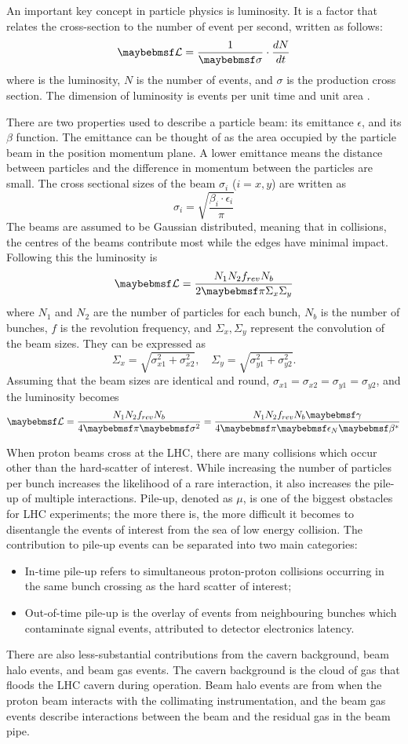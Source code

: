 An important key concept in particle physics is luminosity. It is a factor that relates the cross-section to the number of event per second, written as follows:
$$\luminosity=\dfrac{1}{\sigma}\cdot\dfrac{dN}{dt}$$
where \luminosity is the luminosity, $N$ is the number of events, and $\sigma$ is the production cross section. The dimension of luminosity is events per unit time and unit area \unit{}{\cm\rpsquared}\unit{}{\second\rp}.

There are two properties used to describe a particle beam: its  emittance $\epsilon$, and its $\beta$ function. The emittance can be thought of as the area occupied by the particle beam in the position momentum plane. A lower emittance means the distance between particles and the difference in momentum between the particles are small. The cross sectional sizes of the beam $\sigma_i$ ($i=x,y$) are written as 
$$\sigma_i=\sqrt{\dfrac{\beta_i\cdot\epsilon_i}{\pi}}$$ The beams are assumed to be Gaussian distributed, meaning that in collisions, the centres of the beams contribute most while the edges have minimal impact. Following this the luminosity is
$$\luminosity=\dfrac{N_1N_2f_{rev}N_b}{2\pi\Sigma_x\Sigma_y}$$
where $N_1$ and $N_2$ are the number of particles for each bunch, $N_b$ is the number of bunches, $f$ is the revolution frequency, and $\Sigma_x,\Sigma_y$ represent the  convolution of the beam sizes. They can be expressed as
$$\Sigma_x=\sqrt{\sigma_{x1}^2+\sigma_{x2}^2}, \quad \Sigma_y=\sqrt{\sigma_{y1}^2+\sigma_{y2}^2}.$$
Assuming that the beam sizes are identical and round, $\sigma_{x1}=\sigma_{x2}=\sigma_{y1}=\sigma_{y2}$, and the luminosity becomes
$$\luminosity=\dfrac{N_1N_2f_{rev}N_b}{4\pi\sigma^2}=\dfrac{N_1N_2f_{rev}N_b\gamma}{4\pi\epsilon_N\beta^*}$$

When proton beams cross at the LHC, there are many collisions which occur other than the hard-scatter of interest. While increasing the number of particles per bunch increases the likelihood of a rare interaction, it also increases the pile-up of multiple interactions. Pile-up, denoted as $\mu$, is one of the biggest obstacles for LHC experiments; the more there is, the more difficult it becomes to disentangle the events of interest from the sea of low energy collision. The contribution to pile-up events can be separated into two main categories: 
\begin{itemize}
  \item In-time pile-up refers to simultaneous proton-proton collisions occurring in the same bunch crossing as the hard scatter of interest;
  \item Out-of-time pile-up is the overlay of events from neighbouring bunches which contaminate signal events, attributed to detector electronics latency.
\end{itemize}
There are also less-substantial contributions from the cavern background, beam halo events, and beam gas events. The cavern background is the cloud of gas that floods the LHC cavern during operation. Beam halo events are from when the proton beam interacts with the collimating instrumentation, and the beam gas events describe interactions between the beam and the residual gas in the beam pipe. 

